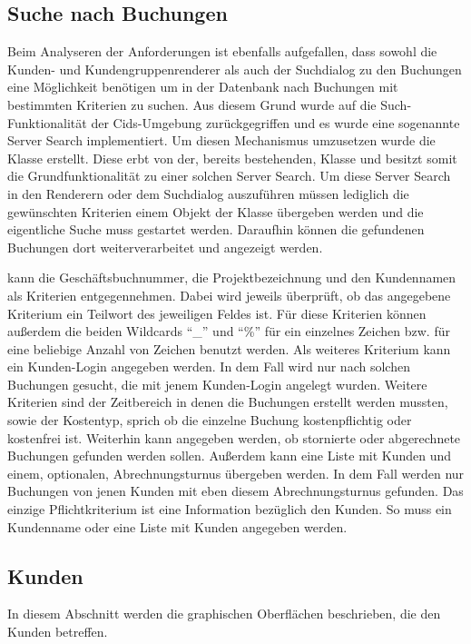 \subsection{Suche nach Buchungen} \label{subsec:serversearch}
Beim Analyseren der Anforderungen ist ebenfalls aufgefallen, dass sowohl die Kunden- und Kundengruppenrenderer als auch der Suchdialog zu den Buchungen eine Möglichkeit benötigen um in der Datenbank nach Buchungen mit bestimmten Kriterien zu suchen.
Aus diesem Grund wurde auf die Such-Funktionalität der Cids-Umgebung zurückgegriffen und es wurde eine sogenannte Server Search implementiert.
Um diesen Mechanismus umzusetzen wurde die Klasse  erstellt.
Diese erbt von der, bereits bestehenden, Klasse  und besitzt somit die Grundfunktionalität zu einer solchen Server Search.
Um diese Server Search in den Renderern oder dem Suchdialog auszuführen müssen lediglich die gewünschten Kriterien einem Objekt der Klasse  übergeben werden und die eigentliche Suche muss gestartet werden.
Daraufhin können die gefundenen Buchungen dort weiterverarbeitet und angezeigt werden.

 kann die Geschäftsbuchnummer, die Projektbezeichnung und den Kundennamen als Kriterien entgegennehmen.
Dabei wird jeweils überprüft, ob das angegebene Kriterium ein Teilwort des jeweiligen Feldes ist.
Für diese Kriterien können außerdem die beiden Wildcards \enquote{\_} und \enquote{\%} für ein einzelnes Zeichen bzw. für eine beliebige Anzahl von Zeichen benutzt werden.
Als weiteres Kriterium kann ein Kunden-Login angegeben werden.
In dem Fall wird nur nach solchen Buchungen gesucht, die mit jenem Kunden-Login angelegt wurden.
Weitere Kriterien sind der Zeitbereich in denen die Buchungen erstellt werden mussten, sowie der Kostentyp, sprich ob die einzelne Buchung kostenpflichtig oder kostenfrei ist.
Weiterhin kann angegeben werden, ob stornierte oder abgerechnete Buchungen gefunden werden sollen.
Außerdem kann eine Liste mit Kunden und einem, optionalen, Abrechnungsturnus übergeben werden.
In dem Fall werden nur Buchungen von jenen Kunden mit eben diesem  Abrechnungsturnus gefunden.
Das einzige Pflichtkriterium ist eine Information bezüglich den Kunden. So muss ein Kundenname oder eine Liste mit Kunden angegeben werden.

\subsection{Kunden}
In diesem Abschnitt werden die graphischen Oberflächen beschrieben, die den Kunden betreffen.
